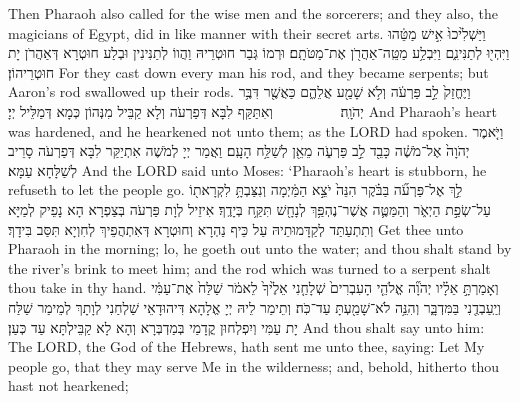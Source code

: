 {{Then Pharaoh also called for the wise men and the sorcerers; and they also, the magicians of Egypt, did in like manner with their secret arts.}{}
{וַיַּשְׁלִ֙יכוּ֙ אִ֣ישׁ מַטֵּ֔הוּ וַיִּהְי֖וּ לְתַנִּינִ֑ם וַיִּבְלַ֥ע מַטֵּֽה־אַהֲרֹ֖ן אֶת־מַטֹּתָֽם׃
}
{וּרְמוֹ גְּבַר חוּטְרֵיהּ וַהֲווֹ לְתַנִּינִין וּבְלַע חוּטְרָא דְּאַהֲרֹן יָת חוּטְרֵיהוֹן׃}
{For they cast down every man his rod, and they became serpents; but Aaron’s rod swallowed up their rods.}{}
{וַיֶּחֱזַק֙ לֵ֣ב פַּרְעֹ֔ה וְלֹ֥א שָׁמַ֖ע אֲלֵהֶ֑ם כַּאֲשֶׁ֖ר דִּבֶּ֥ר יְהֹוָֽה׃ \setuma         }
{וְאִתַּקַּף לִבָּא דְּפַרְעֹה וְלָא קַבֵּיל מִנְּהוֹן כְּמָא דְּמַלֵּיל יְיָ׃}
{And Pharaoh’s heart was hardened, and he hearkened not unto them; as the LORD had spoken.}{}
{וַיֹּ֤אמֶר יְהֹוָה֙ אֶל־מֹשֶׁ֔ה כָּבֵ֖ד לֵ֣ב פַּרְעֹ֑ה מֵאֵ֖ן לְשַׁלַּ֥ח הָעָֽם׃
}
{וַאֲמַר יְיָ לְמֹשֶׁה אִתְיַקַּר לִבָּא דְּפַרְעֹה סָרֵיב לְשַׁלָּחָא עַמָּא׃}
{And the LORD said unto Moses: ‘Pharaoh’s heart is stubborn, he refuseth to let the people go.}{}
{לֵ֣ךְ אֶל־פַּרְעֹ֞ה בַּבֹּ֗קֶר הִנֵּה֙ יֹצֵ֣א הַמַּ֔יְמָה וְנִצַּבְתָּ֥ לִקְרָאת֖וֹ עַל־שְׂפַ֣ת הַיְאֹ֑ר וְהַמַּטֶּ֛ה אֲשֶׁר־נֶהְפַּ֥ךְ לְנָחָ֖שׁ תִּקַּ֥ח בְּיָדֶֽךָ׃
}
{אִיזֵיל לְוָת פַּרְעֹה בְּצַפְרָא הָא נָפֵיק לְמַיָּא וְתִתְעַתַּד לְקַדָּמוּתֵיהּ עַל כֵּיף נַהְרָא וְחוּטְרָא דְּאִתְהֲפֵיךְ לְחִוְיָא תִּסַּב בִּידָךְ׃}
{Get thee unto Pharaoh in the morning; lo, he goeth out unto the water; and thou shalt stand by the river’s brink to meet him; and the rod which was turned to a serpent shalt thou take in thy hand.}{}
{וְאָמַרְתָּ֣ אֵלָ֗יו יְהֹוָ֞ה אֱלֹהֵ֤י הָעִבְרִים֙ שְׁלָחַ֤נִי אֵלֶ֙יךָ֙ לֵאמֹ֔ר שַׁלַּח֙ אֶת־עַמִּ֔י וְיַֽעַבְדֻ֖נִי בַּמִּדְבָּ֑ר וְהִנֵּ֥ה לֹא־שָׁמַ֖עְתָּ עַד־כֹּֽה׃
}
{וְתֵימַר לֵיהּ יְיָ אֱלָהָא דִּיהוּדָאֵי שַׁלְחַנִי לְוָתָךְ לְמֵימַר שַׁלַּח יָת עַמִּי וְיִפְלְחוּן קֳדָמַי בְּמַדְבְּרָא וְהָא לָא קַבֵּילְתָּא עַד כְּעַן׃}
{And thou shalt say unto him: The LORD, the God of the Hebrews, hath sent me unto thee, saying: Let My people go, that they may serve Me in the wilderness; and, behold, hitherto thou hast not hearkened;}{}
}
